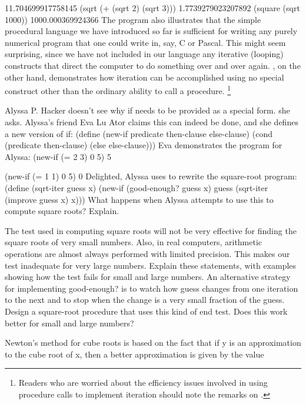11.704699917758145
(sqrt (+ (sqrt 2) (sqrt 3)))
1.7739279023207892
(square (sqrt 1000))
1000.000369924366
\stopcode
The  program also illustrates that the simple procedural language we have introduced so far
is sufficient for writing any purely numerical program that one could write in, say, C or Pascal.
This might seem surprising,
since we have not included in our language any iterative (looping) constructs
that direct the computer to do something over and over again.
, on the other hand,
demonstrates how iteration can be accomplished using no special construct
other than the ordinary ability to call a procedure.
\footnote{%
   Readers who are worried about the efficiency issues involved in using procedure calls to implement iteration
   should note the remarks on  .
}

\beginexercise
Alyssa P. Hacker doesn't see why if needs to be provided as a special form.
 she asks.
Alyssa's friend Eva Lu Ator claims this can indeed be done, and she defines a new version of if:
\startcode
(define (new-if predicate then-clause else-clause)
  (cond (predicate then-clause)
        (else else-clause)))
\stopcode
Eva demonstrates the program for Alyssa:
\startcode
(new-if (= 2 3) 0 5)
5

(new-if (= 1 1) 0 5)
0
\stopcode
Delighted, Alyssa uses  to rewrite the square-root program:
\startcode
(define (sqrt-iter guess x)
  (new-if (good-enough? guess x)
          guess
          (sqrt-iter (improve guess x)
                     x)))
\stopcode
What happens when Alyssa attempts to use this to compute square roots? Explain.
\endexercise

\beginexercise
The  test used in computing square roots
will not be very effective for finding the square roots of very small numbers.
Also, in real computers,
arithmetic operations are almost always performed with limited precision.
This makes our test inadequate for very large numbers.
Explain these statements, with examples showing how the test fails for small and large numbers.
An alternative strategy for implementing good-enough? is to watch
how guess changes from one iteration to the next and to stop when the change is a very small fraction of the guess.
Design a square-root procedure that uses this kind of end test.
Does this work better for small and large numbers?
\endexercise

\beginexercise
Newton's method for cube roots is based on the fact
that if y is an approximation to the cube root of x, then a better approximation is given by the value

